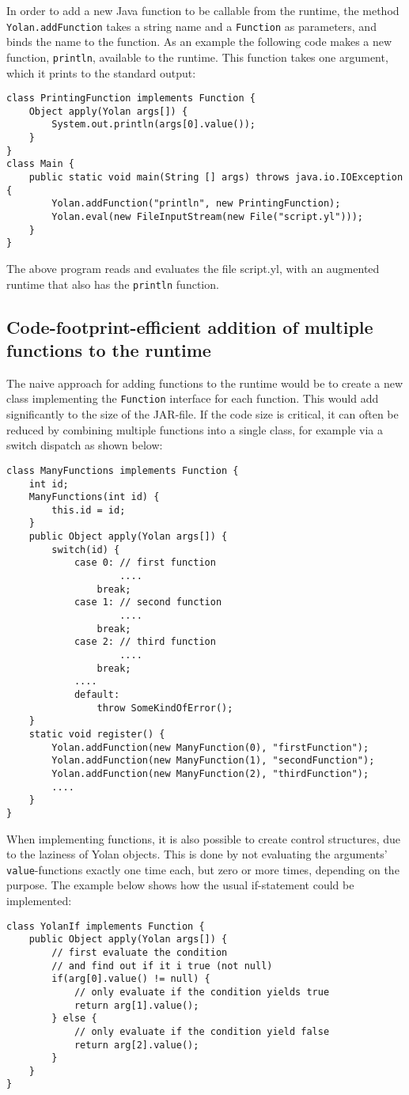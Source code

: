 \documentclass[11pt]{report}
\begin{document}
In order to add a new Java function to be callable from the runtime, the method \verb|Yolan.addFunction| takes a string name and a \verb|Function| as parameters, and binds the name to the function. As an example the following code makes a new function, \verb|println|, available to the runtime. This function takes one argument, which it prints to the standard output:
\begin{lstlisting}
class PrintingFunction implements Function {
    Object apply(Yolan args[]) {
        System.out.println(args[0].value());
    }
}
class Main {
    public static void main(String [] args) throws java.io.IOException {
        Yolan.addFunction("println", new PrintingFunction);
        Yolan.eval(new FileInputStream(new File("script.yl")));
    }
}
\end{lstlisting} 
The above program reads and evaluates the file script.yl, with an augmented runtime that also has the \verb|println| function.

\subsection{Code-footprint-efficient addition of multiple functions to the runtime}
The naive approach for adding functions to the runtime would be to create a new class implementing the \verb|Function| interface for each function. This would add significantly to the size of the JAR-file.
If the code size is critical, it can often be reduced by combining multiple functions into a single class, for example via a switch dispatch as shown below:
\begin{lstlisting}
class ManyFunctions implements Function {
    int id;
    ManyFunctions(int id) {
        this.id = id;
    }
    public Object apply(Yolan args[]) {
        switch(id) {
            case 0: // first function
                    ....
                break;
            case 1: // second function
                    ....
                break;
            case 2: // third function
                    ....
                break;
            ....
            default:
                throw SomeKindOfError();
    }
    static void register() {
        Yolan.addFunction(new ManyFunction(0), "firstFunction");
        Yolan.addFunction(new ManyFunction(1), "secondFunction");
        Yolan.addFunction(new ManyFunction(2), "thirdFunction");
        ....
    }
}
\end{lstlisting}

When implementing functions, it is also possible to create control structures, due to the laziness of Yolan objects. This is done by not evaluating the arguments' \verb|value|-functions exactly one time each, but zero or more times, depending on the purpose. The example below shows how the usual if-statement could be implemented:
\begin{lstlisting}
class YolanIf implements Function {
    public Object apply(Yolan args[]) {
        // first evaluate the condition
        // and find out if it i true (not null)
        if(arg[0].value() != null) {
            // only evaluate if the condition yields true
            return arg[1].value();
        } else {
            // only evaluate if the condition yield false
            return arg[2].value();
        }
    }
}
\end{lstlisting}
\end{document}
